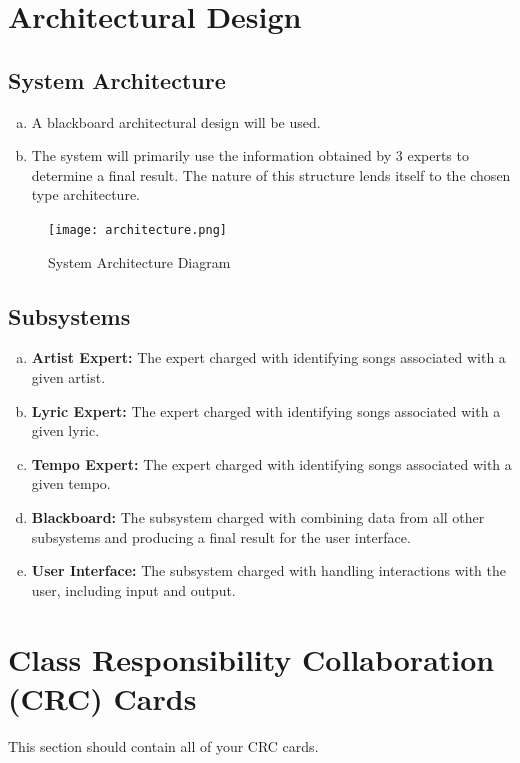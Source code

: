 \documentclass[]{article}
\begin{document}
\section{Architectural Design}
\label{sec:architectural_design}

\subsection{System Architecture}
\label{sub:system_architecture}
\begin{enumerate}[a)]
	\item A blackboard architectural design will be used.
	\item The system will primarily use the information obtained by 3 experts to determine a final result. The nature of this structure lends itself to the chosen type architecture.
\end{enumerate}
\begin{figure}[!ht]
	\centering
	\texttt{[image: architecture.png]}
	\caption{System Architecture Diagram}
\end{figure}

\subsection{Subsystems}
\label{sub:subsystems}
\begin{enumerate}[a)]
	\item \textbf{Artist Expert:} The expert charged with identifying songs associated with a given artist.
	\item \textbf{Lyric Expert:} The expert charged with identifying songs associated with a given lyric.
	\item \textbf{Tempo Expert:} The expert charged with identifying songs associated with a given tempo.
	\item \textbf{Blackboard:} The subsystem charged with combining data from all other subsystems and producing a final result for the user interface.
	\item \textbf{User Interface:} The subsystem charged with handling interactions with the user, including input and output.
\end{enumerate}

	
\section{Class Responsibility Collaboration (CRC) Cards}
\label{sec:class_responsibility_collaboration_crc_cards}
This section should contain all of your CRC cards.
\end{document}
